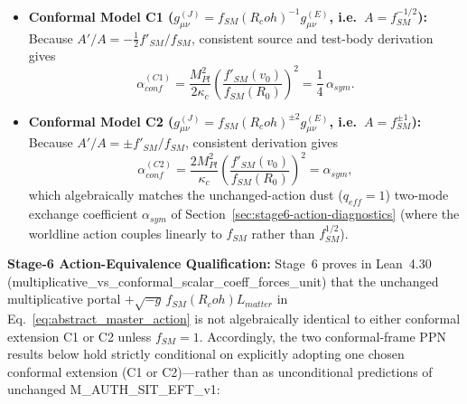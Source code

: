 \documentclass[american,11pt,letterpaper]{article}
\newcommand{\Rcoh}{R_{\mathrm{coh}}}
\def\mathcal#1{#1}%
\def\mathrm#1{#1}%
\def\texttt#1{#1}%
\def\emph#1{#1}%
\def\Rcoh{R_coh}%
\begin{document}
\begin{itemize}
  \item \textbf{Conformal Model C1 ($g_{\mu\nu}^{(J)} = f_{\mathrm{SM}}(\Rcoh)^{-1} g_{\mu\nu}^{(E)}$, i.e.\ $A = f_{\mathrm{SM}}^{-1/2}$):} Because $A'/A = -\frac{1}{2}f'_{\mathrm{SM}}/f_{\mathrm{SM}}$, consistent source and test-body derivation gives
  \begin{equation}
  \alpha_{\mathrm{conf}}^{(\mathrm{C1})} = \frac{M_{\mathrm{Pl}}^2}{2\kappa_c}\left(\frac{f'_{\mathrm{SM}}(v_0)}{f_{\mathrm{SM}}(R_0)}\right)^2 = \frac{1}{4}\,\alpha_{\mathrm{sym}}.
  \label{eq:alpha_conf_C1}
  \end{equation}
  \item \textbf{Conformal Model C2 ($g_{\mu\nu}^{(J)} = f_{\mathrm{SM}}(\Rcoh)^{\pm 2} g_{\mu\nu}^{(E)}$, i.e.\ $A = f_{\mathrm{SM}}^{\pm 1}$):} Because $A'/A = \pm f'_{\mathrm{SM}}/f_{\mathrm{SM}}$, consistent derivation gives
  \begin{equation}
  \alpha_{\mathrm{conf}}^{(\mathrm{C2})} = \frac{2 M_{\mathrm{Pl}}^2}{\kappa_c}\left(\frac{f'_{\mathrm{SM}}(v_0)}{f_{\mathrm{SM}}(R_0)}\right)^2 = \alpha_{\mathrm{sym}},
  \label{eq:alpha_sym_exact}
  \end{equation}
  which algebraically matches the unchanged-action dust ($q_{\mathrm{eff}} = 1$) two-mode exchange coefficient $\alpha_{\mathrm{sym}}$ of Section~\ref{sec:stage6-action-diagnostics} (where the worldline action couples linearly to $f_{\mathrm{SM}}$ rather than $f_{\mathrm{SM}}^{1/2}$).
\end{itemize}
\textbf{Stage-6 Action-Equivalence Qualification:} Stage~6 proves in Lean~4.30 (\texttt{multiplicative\_\allowbreak{}vs\_\allowbreak{}conformal\_\allowbreak{}scalar\_\allowbreak{}coeff\_\allowbreak{}forces\_\allowbreak{}unit}) that the unchanged multiplicative portal $+\sqrt{-g}\,f_{\mathrm{SM}}(\Rcoh)\mathcal{L}_{\mathrm{matter}}$ in Eq.~\eqref{eq:abstract_master_action} is \emph{not} algebraically identical to \emph{either} conformal extension C1 or C2 unless $f_{\mathrm{SM}} = 1$. Accordingly, the two conformal-frame PPN results below hold strictly \emph{conditional} on explicitly adopting one chosen conformal extension (C1 or C2)---rather than as unconditional predictions of unchanged \texttt{M\_AUTH\_SIT\_EFT\_v1}:
\end{document}
